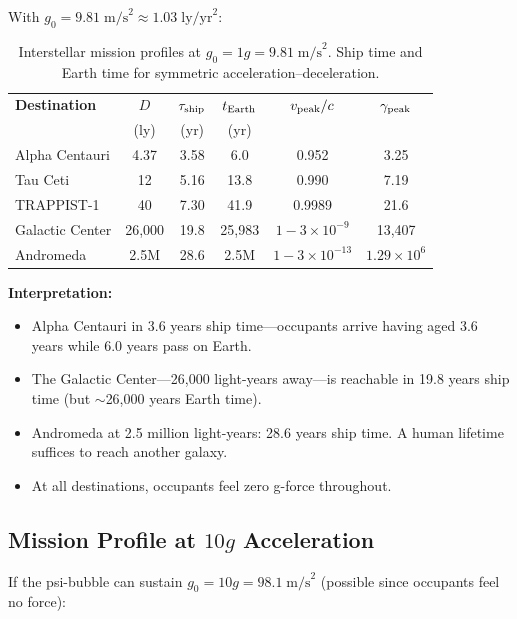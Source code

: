 \documentclass[aps,prd,twocolumn,superscriptaddress,nofootinbib]{revtex4-2}
\newcommand{\ee}[1]{\times 10^{#1}}
\begin{document}
With $g_0 = 9.81\;\text{m/s}^2 \approx 1.03\;\text{ly/yr}^2$:

\begin{table}[H]
\centering
\caption{Interstellar mission profiles at $g_0 = 1g =
9.81\;\text{m/s}^2$.  Ship time and Earth time for
symmetric acceleration--deceleration.}
\label{tab:1g-missions}
\begin{tabular}{lccccc}
\toprule
\textbf{Destination} & $D$ & $\tau_{\rm ship}$ &
$t_{\rm Earth}$ & $v_{\rm peak}/c$ & $\gamma_{\rm peak}$ \\
 & (ly) & (yr) & (yr) & & \\
\midrule
Alpha Centauri    & 4.37   & 3.58   & 6.0    & 0.952  & 3.25 \\
Tau Ceti          & 12     & 5.16   & 13.8   & 0.990  & 7.19 \\
TRAPPIST-1        & 40     & 7.30   & 41.9   & 0.9989 & 21.6 \\
Galactic Center   & 26,000 & 19.8   & 25,983 & $1 - 3\ee{-9}$ & 13,407 \\
Andromeda         & 2.5M   & 28.6   & 2.5M   & $1 - 3\ee{-13}$ & $1.29\ee{6}$ \\
\bottomrule
\end{tabular}
\end{table}

\textbf{Interpretation:}
\begin{itemize}
\item Alpha Centauri in 3.6 years ship time---occupants arrive
having aged 3.6 years while 6.0 years pass on Earth.
\item The Galactic Center---26,000 light-years away---is reachable
in 19.8 years ship time (but $\sim$26,000 years Earth time).
\item Andromeda at 2.5 million light-years: 28.6 years ship time.
A human lifetime suffices to reach another galaxy.
\item At all destinations, occupants feel zero g-force throughout.
\end{itemize}

\subsection{Mission Profile at $10g$ Acceleration}

If the psi-bubble can sustain $g_0 = 10g = 98.1\;\text{m/s}^2$
(possible since occupants feel no force):
\end{document}
